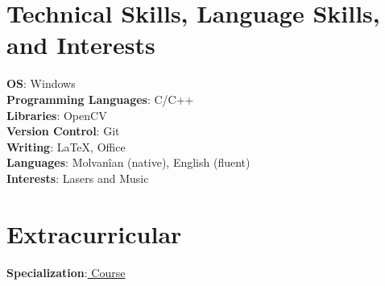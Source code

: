 \documentclass[letterpaper,10pt]{article}
\begin{document}
\section{Technical Skills, Language Skills, and Interests}
 \begin{itemize}[leftmargin=0.15in, label={}]
    \small{\item{
    \textbf{OS}{: Windows} \\
     \textbf{Programming Languages}{: C/C++} \\
     \textbf{Libraries}{: OpenCV}\\
     \textbf{Version Control}{: Git} \\
     \textbf{Writing}{: \LaTeX, Office} \\
     \textbf{Languages}{: Molvanîan (native), English (fluent)} \\
     \textbf{Interests}{: Lasers and Music}

    }}
 \end{itemize}

\section{Extracurricular}
 \begin{itemize}[leftmargin=0.15in, label={}]
    \small{\item{
     \textbf{Specialization}{:\href{certification site}{ Course} }
    }}

 \end{itemize}
\end{document}
